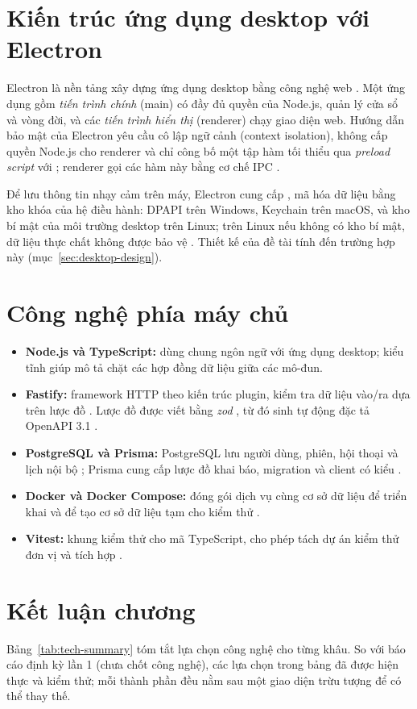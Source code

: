 \section{Kiến trúc ứng dụng desktop với Electron}
Electron là nền tảng xây dựng ứng dụng desktop bằng công nghệ web \cite{electron}. Một ứng dụng gồm \textit{tiến trình chính} (main) có đầy đủ quyền của Node.js, quản lý cửa sổ và vòng đời, và các \textit{tiến trình hiển thị} (renderer) chạy giao diện web. Hướng dẫn bảo mật của Electron yêu cầu cô lập ngữ cảnh (context isolation), không cấp quyền Node.js cho renderer và chỉ công bố một tập hàm tối thiểu qua \textit{preload script} với ; renderer gọi các hàm này bằng cơ chế IPC \cite{electronsecurity}.

Để lưu thông tin nhạy cảm trên máy, Electron cung cấp , mã hóa dữ liệu bằng kho khóa của hệ điều hành: DPAPI trên Windows, Keychain trên macOS, và kho bí mật của môi trường desktop trên Linux; trên Linux nếu không có kho bí mật, dữ liệu thực chất không được bảo vệ \cite{electronsafestorage}. Thiết kế của đề tài tính đến trường hợp này (mục~\ref{sec:desktop-design}).

\section{Công nghệ phía máy chủ}
\begin{itemize}
  \item \textbf{Node.js và TypeScript:} dùng chung ngôn ngữ với ứng dụng desktop; kiểu tĩnh giúp mô tả chặt các hợp đồng dữ liệu giữa các mô-đun.
  \item \textbf{Fastify:} framework HTTP theo kiến trúc plugin, kiểm tra dữ liệu vào/ra dựa trên lược đồ \cite{fastify}. Lược đồ được viết bằng \textit{zod} \cite{zod}, từ đó sinh tự động đặc tả OpenAPI 3.1 \cite{openapi}.
  \item \textbf{PostgreSQL và Prisma:} PostgreSQL lưu người dùng, phiên, hội thoại và lịch nội bộ \cite{postgres}; Prisma cung cấp lược đồ khai báo, migration và client có kiểu \cite{prisma}.
  \item \textbf{Docker và Docker Compose:} đóng gói dịch vụ cùng cơ sở dữ liệu để triển khai và để tạo cơ sở dữ liệu tạm cho kiểm thử \cite{docker}.
  \item \textbf{Vitest:} khung kiểm thử cho mã TypeScript, cho phép tách dự án kiểm thử đơn vị và tích hợp \cite{vitest}.
\end{itemize}

\section{Kết luận chương}
Bảng~\ref{tab:tech-summary} tóm tắt lựa chọn công nghệ cho từng khâu. So với báo cáo định kỳ lần 1 (chưa chốt công nghệ), các lựa chọn trong bảng đã được hiện thực và kiểm thử; mỗi thành phần đều nằm sau một giao diện trừu tượng để có thể thay thế.

